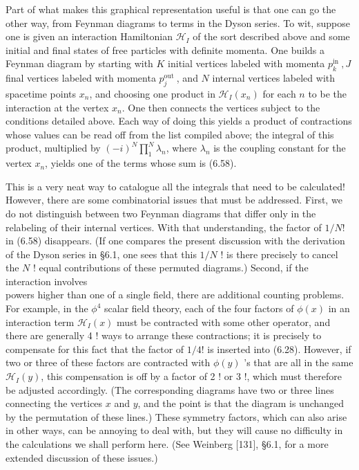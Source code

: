\documentclass[10pt, letterpaper]{article}
\begin{document}
\begin{itemize}
Part of what makes this graphical representation useful is that one can go the other way, from Feynman diagrams to terms in the Dyson series. To wit, suppose one is given an interaction Hamiltonian $\mathcal{H}_{I}$ of the sort described above and some initial and final states of free particles with definite momenta. One builds a Feynman diagram by starting with $K$ initial vertices labeled with momenta $p_{k}^{\text {in }}, J$ final vertices labeled with momenta $p_{j}^{\text {out }}$, and $N$ internal vertices labeled with spacetime points $x_{n}$, and choosing one product in $\mathcal{H}_{I}\left(x_{n}\right)$ for each $n$ to be the interaction at the vertex $x_{n}$. One then connects the vertices subject to the conditions detailed above. Each way of doing this yields a product of contractions whose values can be read off from the list compiled above; the integral of this product, multiplied by $(-i)^{N} \prod_{1}^{N} \lambda_{n}$, where $\lambda_{n}$ is the coupling constant for the vertex $x_{n}$, yields one of the terms whose sum is (6.58).
\end{itemize}

This is a very neat way to catalogue all the integrals that need to be calculated! However, there are some combinatorial issues that must be addressed. First, we do not distinguish between two Feynman diagrams that differ only in the relabeling of their internal vertices. With that understanding, the factor of $1 / N!$ in (6.58) disappears. (If one compares the present discussion with the derivation of the Dyson series in §6.1, one sees that this $1 / N$ ! is there precisely to cancel the $N$ ! equal contributions of these permuted diagrams.) Second, if the interaction involves\\
powers higher than one of a single field, there are additional counting problems. For example, in the $\phi^{4}$ scalar field theory, each of the four factors of $\phi(x)$ in an interaction term $\mathcal{H}_{I}(x)$ must be contracted with some other operator, and there are generally 4 ! ways to arrange these contractions; it is precisely to compensate for this fact that the factor of $1 / 4!$ is inserted into (6.28). However, if two or three of these factors are contracted with $\phi(y)$ 's that are all in the same $\mathcal{H}_{I}(y)$, this compensation is off by a factor of 2 ! or 3 !, which must therefore be adjusted accordingly. (The corresponding diagrams have two or three lines connecting the vertices $x$ and $y$, and the point is that the diagram is unchanged by the permutation of these lines.) These symmetry factors, which can also arise in other ways, can be annoying to deal with, but they will cause no difficulty in the calculations we shall perform here. (See Weinberg [131], §6.1, for a more extended discussion of these issues.)
\end{document}

